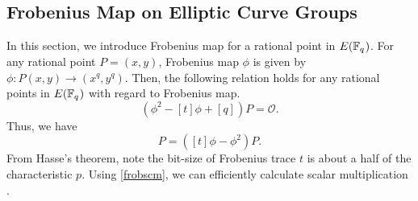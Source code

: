 \subsection{Frobenius Map on Elliptic Curve Groups}
In this section, we introduce Frobenius map for a rational point in $E({\mathbb{F}}_{q^{}})$.
For any rational point $P=(x, y)$, Frobenius map $\phi$ is given by $\phi:P(x, y) \rightarrow ({x}^q, {y}^q)$.
Then, the following relation holds for any rational points in $E({\mathbb{F}}_{q^{}})$ with regard to Frobenius map.
\begin{equation*}
\left(\phi^{2}-[t]\phi+[q]\right)P=\mathcal{O}.
\end{equation*}
Thus, we have
\begin{equation}
[q]P=\left([t]\phi-\phi^2\right)P. \label{frobscm}
\end{equation}
From Hasse's theorem, note the bit-size of Frobenius trace $t$ is about a half of the characteristic $p$. 
Using \eqref{frobscm}, we can efficiently calculate scalar multiplication \cite{C:Koblitz91}.

